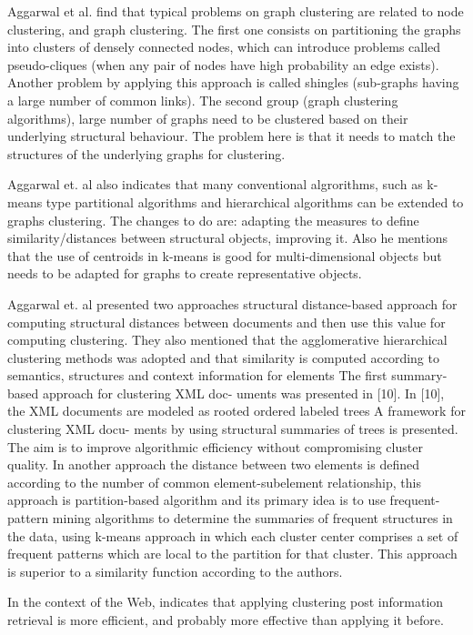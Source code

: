 \documentclass[runningheads]{llncs}
\begin{document}
Aggarwal et al.  \cite{Aggarwal} find that typical problems on graph clustering are related to node clustering, and graph clustering. The first one consists on partitioning the graphs into clusters of densely connected nodes, which can introduce problems called pseudo-cliques (when any pair of nodes have high probability an edge exists). Another problem by applying this approach is called shingles (sub-graphs having a large number of common links). The second group (graph clustering algorithms), large number of graphs need to be clustered based on their underlying structural behaviour. The problem here is that it needs to match the structures of the underlying graphs for clustering.

Aggarwal et. al \cite{Aggarwal} also indicates that many conventional algrorithms, such as k-means type partitional algorithms and hierarchical algorithms can be extended to graphs clustering. The changes to do are: adapting the measures to define similarity/distances between structural objects, improving it. Also he mentions that the use of centroids in k-means is good for multi-dimensional objects but needs to be adapted for graphs to create representative objects. 

Aggarwal et. al \cite{Aggarwal} presented two approaches structural distance-based approach for computing structural distances between documents and then use this value for computing clustering. They also mentioned that the agglomerative hierarchical clustering methods was adopted and that similarity is computed according to semantics, structures and context information for elements The first summary-based approach for clustering XML doc- uments was presented in [10]. In [10], the XML documents are modeled as rooted ordered labeled trees  A framework for clustering XML docu- ments by using structural summaries of trees is presented. The aim is to improve algorithmic efficiency without compromising cluster quality.  In another approach the distance between two elements is defined according to the number of common element-subelement relationship, this approach is partition-based algorithm and its primary idea is to use frequent-pattern mining algorithms to determine the summaries of frequent structures in the data, using k-means approach in which each cluster center comprises a set of frequent patterns which are local to the partition for that cluster. This approach is superior to a similarity function according to the authors.

In the context of the Web, \cite{Carpineto} indicates that applying clustering post information retrieval is more efficient, and probably more effective than applying it before.
\end{document}
